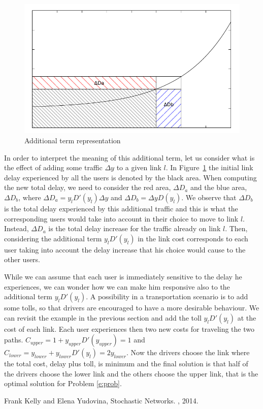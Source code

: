 \begin{figure}[h!]
\centering
\includegraphics[scale=.7]{fig3.pdf}
\caption{Additional term representation}
\label{fig:3}
\end{figure}

In order to interpret the meaning of this additional term, let us consider what is the effect of adding some  traffic $\Delta y$ to a given link $l$.
In Figure~\ref{fig:3} the initial link delay experienced by all the users is denoted by the black area. When computing the new total delay, we need to consider the red area, $\Delta D_{a}$ and the blue area, $\Delta D_{b}$, where $\Delta D_{a} = y_l D'(y_l ) \Delta y$ and $\Delta D_b = \Delta y D(y_l)$. %
We observe that $\Delta D_{b}$ is the total delay experienced by this additional traffic and this is what the corresponding users would take into account in their choice to move to link $l$.
Instead, $\Delta D_{a}$ is the total delay increase for the traffic already on link $l$. Then, considering the additional term $y_l D'(y_l)$ in the link cost corresponds to each user taking into account the delay increase that his choice would cause to the other users.

While we can assume that each user is immediately sensitive to the delay he experiences, we can wonder how we can make him responsive also to the additional term $y_l D'(y_l)$. A possibility in a transportation scenario is to add some tolls, so that  drivers are encouraged to have a more desirable behaviour. We can revisit the example in the previous section and  add the toll $y_l D'(y_l)$ at the cost of each link. Each user experiences then two new costs for traveling the two paths. 
 $C_{upper}=1 + y_{upper} D'(y_{upper})= 1$ and   $C_{lower} = y_{lower} + y_{lower} D'(y_l)= 2y_{lower}$. Now the drivers choose the link where the total cost, delay plus toll, is minimum and the final solution is that half of the drivers choose the lower link and the others choose the upper link, that is the optimal solution for Problem \eqref{e:prob}.



\begin{thebibliography}{alpha}

 Frank Kelly and Elena Yudovina,
\newblock Stochastic Networks.
, 2014.

\end{thebibliography}




